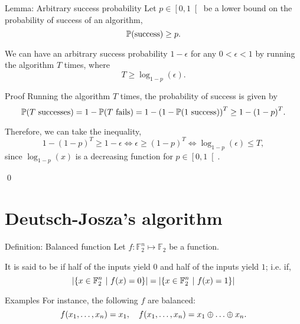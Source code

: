 \documentclass[a4paper]{article}
\begin{document}
\begin{parag}{Lemma: Arbitrary success probability}
    Let $p \in \left[0, 1\right[$ be a lower bound on the probability of success of an algorithm, 
    \[\prob\left(\text{success}\right) \geq p.\]

    We can have an arbitrary success probability $1 - \epsilon$ for any $0 < \epsilon < 1$ by running the algorithm $T$ times, where
    \[T \geq \log_{1-p}\left(\epsilon\right).\]

    \begin{subparag}{Proof}
        Running the algorithm $T$ times, the probability of success is given by 
        \[\prob\left(\text{$T$ successes}\right) = 1 - \prob\left(\text{$T$ fails}\right) = 1 - \left(1 - \prob\left(\text{$1$ success}\right)\right)^T  \geq 1 - \left(1-p\right)^T.\]

        Therefore, we can take the inequality, 
        \[1 - \left(1-p\right)^T \geq 1 - \epsilon \iff \epsilon \geq \left(1-p\right)^T \iff \log_{1-p}\left(\epsilon\right) \leq T,\]
        since $\log_{1-p}\left(x\right)$ is a decreasing function for $p \in \left[0, 1\right[ $.

        \qed
    \end{subparag}
\end{parag}


\section{Deutsch-Josza's algorithm}

\begin{parag}{Definition: Balanced function}
    Let $f: \mathbb{F}_2^n \mapsto \mathbb{F}_2$ be a function.

    It is said to be  if half of the inputs yield $0$ and half of the inputs yield $1$; i.e. if, 
    \[\left|\left\{x \in \mathbb{F}_2^n \suchthat f\left(x\right) = 0\right\}\right| = \left|\left\{x \in \mathbb{F}_2^n \suchthat f\left(x\right) = 1\right\}\right|\]

    \begin{subparag}{Examples}
        For instance, the following $f$ are balanced:
        \[f\left(x_1, \ldots, x_n\right) = x_1, \mathspace f\left(x_1, \ldots, x_n\right) = x_1 \oplus \ldots \oplus x_n.\]
    \end{subparag}
\end{parag}
\end{document}
